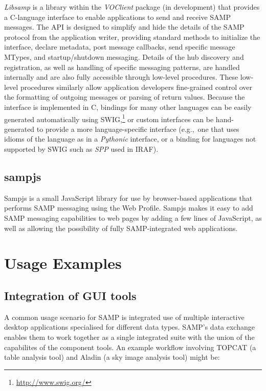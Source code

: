 \documentclass[11pt,twoside]{article}
\begin{document}
{\em Libsamp\/} is a library within the {\em VOClient\/} package
(in development)
that provides a C-language interface to enable applications to send and
receive SAMP messages.  The API is designed to simplify and hide the details
of the SAMP protocol from the application writer, providing standard methods
to initialize the interface, declare metadata, post message callbacks,
send specific message MTypes, and startup/shutdown messaging.
Details of the hub discovery and registration, as well as handling of
specific messaging patterns, are handled internally and are also fully
accessible through low-level procedures.  These low-level procedures
similarly allow application developers fine-grained control over the
formatting of outgoing messages or parsing of return values.  Because the
interface is implemented in C, bindings for many other languages can be
easily generated automatically using SWIG,\footnote{\url{http://www.swig.org/}}
or custom interfaces can be hand-generated to provide a more language-specific
interface (e.g.,\ one that uses idioms of the language as in a {\em Pythonic\/}
interface, or a binding for languages not supported by SWIG such as {\em SPP\/}
used in IRAF).

\subsection{sampjs}

Sampjs is a small JavaScript library for use by browser-based
applications that performs SAMP messaging using the Web Profile.
Sampjs makes it easy to add SAMP messaging capabilities to web pages by
adding a few lines of JavaScript, as well as allowing the possibility
of fully SAMP-integrated web applications.

\section{Usage Examples}
\label{sec:B2_usage}

\subsection{Integration of GUI tools}

A common usage scenario for SAMP is integrated use of
multiple interactive desktop applications specialised for different data types.
SAMP's data exchange enables them to work together as a single
integrated suite with the union of the capabilites of the component tools.
An example workflow involving TOPCAT (a table analysis tool)
and Aladin (a sky image analysis tool) might be:
\end{document}
